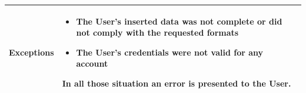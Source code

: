 \documentclass[11pt]{article}
\begin{document}
\begin{description}
\begin{table}[H]
\begin{tabularx}{\textwidth}{|>{\hsize=0.5\hsize}X|>{\hsize=1.5\hsize}X|}
            \hline
            \textbf{Exceptions} & 
                \begin{minipage}[t]{\hsize}
                \vspace{0pt}
                \begin{itemize}[topsep=0pt, leftmargin=*]
                    \item The User's inserted data was not complete or did not comply with the requested formats
                    \item The User's credentials were not valid for any account
                \end{itemize}
                \vspace{8pt}
                \end{minipage}
                In all those situation an error is presented to the User.
                \vspace{6pt}
            \\
            \hline
        \end{tabularx}
    \end{table}
    
    \newpage
    

\end{description}
\end{document}

